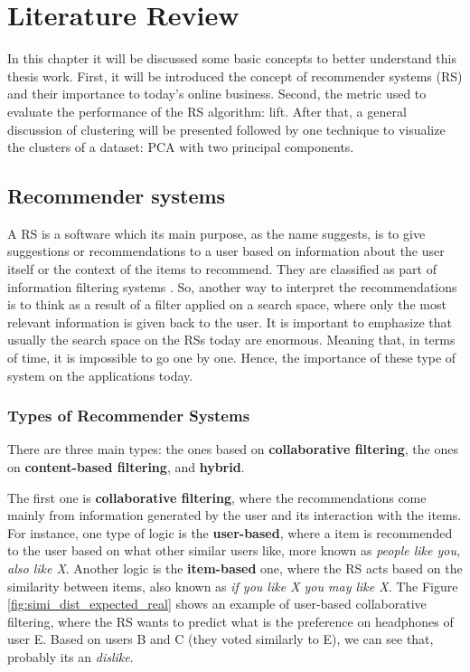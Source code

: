 \newcommand{\ASKA}{$\text{ASK}^0$}
\newcommand{\ASKS}{$\text{ASK}^*$}

\chapter{Literature Review}

In this chapter it will be discussed some basic concepts to better understand this thesis work. First, it will be introduced the concept of  recommender systems (RS) and their importance to today's online business. Second, the metric used to evaluate the performance of the RS algorithm: lift. After that, a general discussion of clustering will be presented followed by one technique to visualize the clusters of a dataset: PCA with two principal components.


\section{Recommender systems}

A RS is a software which its main purpose, as the name suggests, is to give suggestions \cite{ricci2011introduction} or recommendations to a user based on information about the user itself or the context of the items to recommend. They are classified as part of information filtering systems \cite{RecommendersystemWikipedia}. So, another way to interpret the recommendations is to think as a result of a filter applied on a search space, where only the most relevant information is given back to the user. It is important to emphasize that usually the search space on the RSs today are enormous. Meaning that, in terms of time, it is impossible to go one by one. Hence, the importance of these type of system on the applications today.

\subsection{Types of Recommender Systems}

There are three main types: the ones based on \textbf{collaborative filtering}, the ones on \textbf{content-based filtering}, and \textbf{hybrid}. 

The first one is \textbf{collaborative filtering}, where the recommendations come mainly from information generated by the user and its interaction with the items. For instance, one type of logic is the \textbf{user-based}, where a item is recommended to the user based on what other similar users like, more known as \textit{people like you, also like X}. Another logic is the \textbf{item-based} one, where the RS acts based on the similarity between items, also known as \textit{if you like X you may like X}. The Figure \ref{fig:simi_dist_expected_real} shows an example of user-based collaborative filtering, where the RS wants to predict what is the preference on headphones of user E. Based on users B and C (they voted similarly to E), we can see that, probably its an \textit{dislike}.

